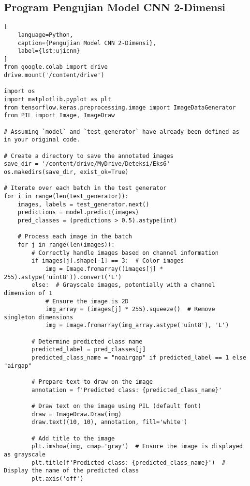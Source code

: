 \subsection*{Program Pengujian Model CNN 2-Dimensi}
\begin{lstlisting}[
    language=Python,
    caption={Pengujian Model CNN 2-Dimensi},
    label={lst:ujicnn}
]
from google.colab import drive
drive.mount('/content/drive')

import os
import matplotlib.pyplot as plt
from tensorflow.keras.preprocessing.image import ImageDataGenerator
from PIL import Image, ImageDraw

# Assuming `model` and `test_generator` have already been defined as in your original code.

# Create a directory to save the annotated images
save_dir = '/content/drive/MyDrive/Deteksi/Eks6'
os.makedirs(save_dir, exist_ok=True)

# Iterate over each batch in the test generator
for i in range(len(test_generator)):
    images, labels = test_generator.next()
    predictions = model.predict(images)
    pred_classes = (predictions > 0.5).astype(int)

    # Process each image in the batch
    for j in range(len(images)):
        # Correctly handle images based on channel information
        if images[j].shape[-1] == 3:  # Color images
            img = Image.fromarray((images[j] * 255).astype('uint8')).convert('L')
        else:  # Grayscale images, potentially with a channel dimension of 1
            # Ensure the image is 2D
            img_array = (images[j] * 255).squeeze()  # Remove singleton dimensions
            img = Image.fromarray(img_array.astype('uint8'), 'L')

        # Determine predicted class name
        predicted_label = pred_classes[j]
        predicted_class_name = "noairgap" if predicted_label == 1 else "airgap"

        # Prepare text to draw on the image
        annotation = f'Predicted class: {predicted_class_name}'

        # Draw text on the image using PIL (default font)
        draw = ImageDraw.Draw(img)
        draw.text((10, 10), annotation, fill='white')

        # Add title to the image
        plt.imshow(img, cmap='gray')  # Ensure the image is displayed as grayscale
        plt.title(f'Predicted class: {predicted_class_name}')  # Display the name of the predicted class
        plt.axis('off')


\end{lstlisting}
